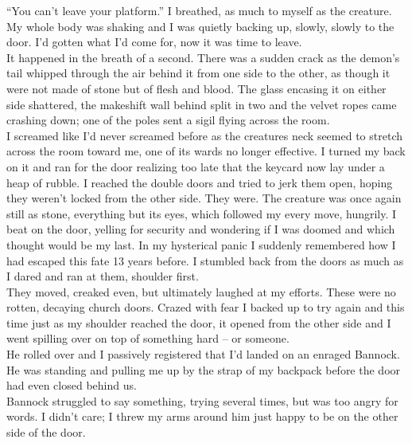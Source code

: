 \documentclass[a5paper]{scrartcl}
\begin{document}
\enquote{You can't leave your platform.} I breathed, as much to myself as the creature. My whole body was shaking and I was quietly backing up, slowly, slowly to the door. I'd gotten what I'd come for, now it was time to leave.\\


It happened in the breath of a second. There was a sudden crack as the demon's tail whipped through the air behind it from one side to the other, as though it were not made of stone but of flesh and blood. The glass encasing it on either side shattered, the makeshift wall behind split in two and the velvet ropes came crashing down; one of the poles sent a sigil flying across the room. \\





I screamed like I'd never screamed before as the creatures neck seemed to stretch across the room toward me, one of its wards no longer effective. I turned my back on it and ran for the door realizing too late that the keycard now lay under a heap of rubble. I reached the double doors and tried to jerk them open, hoping they weren't locked from the other side. They were.  The creature was once again still as stone, everything but its eyes, which followed my every move, hungrily.
I beat on the door, yelling for security and wondering if I was doomed and which thought would be my last. In my hysterical panic I suddenly remembered how I had escaped this fate 13 years before. I stumbled back from the doors as much as I dared and ran at them, shoulder first.\\


They moved, creaked even, but ultimately laughed at my efforts. These were no rotten, decaying church doors. Crazed with fear I backed up to try again and this time just as my shoulder reached the door, it opened from the other side and I went spilling over on top of something hard -- or someone. \\


He rolled over and I passively registered that I'd landed on an enraged Bannock. He was standing and pulling me up by the strap of my backpack before the door had even closed behind us.  \\


Bannock struggled to say something, trying several times, but was too angry for words. I didn't care; I threw my arms around him just happy to be on the other side of the door. \\
\end{document}
